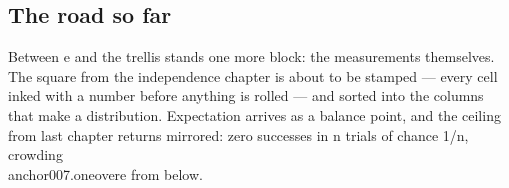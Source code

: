 \cleardoublepage
\begin{narrative}
\section*{The road so far}


\noindent Between e and the trellis stands one more block: the measurements themselves. The square from the independence chapter is about to be stamped — every cell inked with a number before anything is rolled — and sorted into the columns that make a distribution. Expectation arrives as a balance point, and the ceiling from last chapter returns mirrored: zero successes in n trials of chance 1/n, crowding \\anchor{007.oneovere} from below.
\end{narrative}
